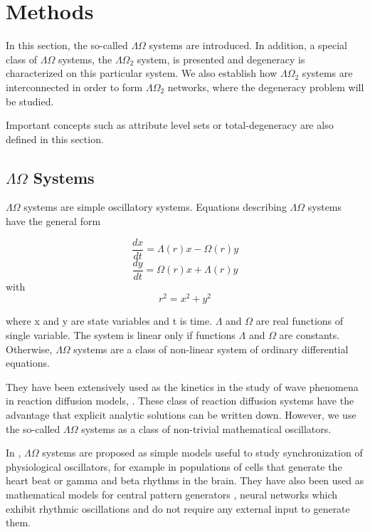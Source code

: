 \chapter{Methods}
\label{sec:methods}
In this section, the so-called $\Lambda \Omega$ systems are introduced. In addition, a special class of $\Lambda \Omega$ systems, the $\Lambda \Omega_{2}$ system, is presented and degeneracy is characterized on this particular system. We also establish how $\Lambda \Omega_{2}$ systems are interconnected in order to form $\Lambda \Omega_{2}$ networks, where the degeneracy problem will be studied.

Important concepts such as attribute level sets or total-degeneracy are also defined in this section.   

\section{$\Lambda \Omega$ Systems}
$\Lambda \Omega$ systems are simple oscillatory systems. Equations describing $\Lambda \Omega$ systems have the general form

\begin{equation}
    \frac{dx}{dt} = \Lambda(r)x-\Omega(r)y
    \label{e1}
\end{equation}
\begin{equation}
    \frac{dy}{dt} = \Omega(r)x+\Lambda(r)y
    \label{e2}
\end{equation}
with
\begin{equation}
r^{2}=x^{2}+y^{2}
\label{e3}
\end{equation}

where x and y are state variables and t is time. $\Lambda$ and $\Omega$ are real functions of single variable. The system is linear only if functions $\Lambda$ and $\Omega$ are constants. Otherwise, $\Lambda \Omega$ systems are a class of non-linear system of ordinary differential equations.

They have been extensively used as the kinetics in the study of wave phenomena in reaction diffusion models, \cite{Kopell1973}. These class of reaction diffusion systems have the advantage that explicit analytic solutions can be written down. However, we use the so-called $\Lambda \Omega$ systems as a class of non-trivial mathematical oscillators.

In \cite{LeonGlass2001}, $\Lambda \Omega$ systems are proposed as simple models useful to study synchronization of physiological oscillators, for example in populations of cells that generate the heart beat or gamma and beta rhythms in the brain.
They have also been used as mathematical models for central pattern generators \cite{Murray2002}, neural networks which exhibit rhythmic oscillations and do not require any external input to generate them.

